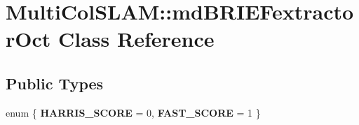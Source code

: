 \hypertarget{classMultiColSLAM_1_1mdBRIEFextractorOct}{}\section{Multi\+Col\+S\+L\+AM\+:\+:md\+B\+R\+I\+E\+Fextractor\+Oct Class Reference}
\label{classMultiColSLAM_1_1mdBRIEFextractorOct}
\subsection*{Public Types}
\begin{DoxyCompactItemize}
\item 
enum \{ {\bfseries H\+A\+R\+R\+I\+S\+\_\+\+S\+C\+O\+RE} = 0, 
{\bfseries F\+A\+S\+T\+\_\+\+S\+C\+O\+RE} = 1
 \}\hypertarget{classMultiColSLAM_1_1mdBRIEFextractorOct_a735244f6047412b75ac43a5d67f4c621}{}\label{classMultiColSLAM_1_1mdBRIEFextractorOct_a735244f6047412b75ac43a5d67f4c621}

\end{DoxyCompactItemize}
